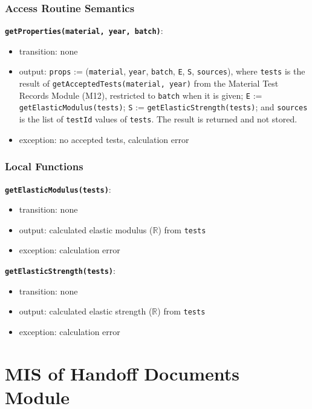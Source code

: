 \documentclass[12pt, titlepage]{article}
\begin{document}
\subsubsection{Access Routine Semantics}

\textbf{\texttt{getProperties(material, year, batch)}}:
\begin{itemize}
  \item transition: none
  \item output: \texttt{props} := (\texttt{material}, \texttt{year}, \texttt{batch}, \texttt{E}, \texttt{S}, \texttt{sources}), where \texttt{tests} is the result of \texttt{getAcceptedTests(material, year)} from the Material Test Records Module (M12), restricted to \texttt{batch} when it is given; \texttt{E} := \texttt{getElastic\allowbreak Modulus(tests)}; \texttt{S} := \texttt{getElastic\allowbreak Strength(tests)}; and \texttt{sources} is the list of \texttt{testId} values of \texttt{tests}. The result is returned and not stored.
  \item exception: no accepted tests, calculation error
\end{itemize}

\subsubsection{Local Functions}

\textbf{\texttt{getElastic\allowbreak Modulus(tests)}}:
\begin{itemize}
  \item transition: none
  \item output: calculated elastic modulus ($\mathbb{R}$) from \texttt{tests}
  \item exception: calculation error
\end{itemize}

\textbf{\texttt{getElastic\allowbreak Strength(tests)}}:
\begin{itemize}
  \item transition: none
  \item output: calculated elastic strength ($\mathbb{R}$) from \texttt{tests}
  \item exception: calculation error
\end{itemize}

\newpage

\section{MIS of Handoff Documents Module} \label{mHandoff}
\end{document}
